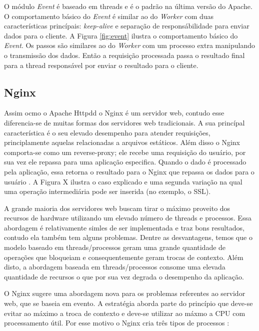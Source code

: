 O módulo \textit{Event} é baseado em threads e é o padrão na última versão do Apache. O comportamento básico do \textit{Event} é similar ao do \textit{Worker} com duas características princípais: \textit{keep-alive} e separação de responsábilidade para enviar dados para o cliente. A Figura \ref{fig:event} ilustra o comportamento básico do \textit{Event}. Os passos são similares ao do \textit{Worker} com um processo extra manipulando o transmissão dos dados. Então a requisição processada passa o resultado final para a thread responsável por enviar o resultado para o cliente.

\subsection{Nginx}

Assim ocmo o Apache Httpdd o Nginx é um servidor web, contudo esse diferencia-se de muitas formas dos servidores web tradicionais. A sua princípal característica é o seu elevado desempenho para atender requisições, principlamente aquelas relacionadas a arquivos estáticos. Além disso o Nginx comporta-se como um reverse-proxy; ele recebe uma requisição do usuário, por sua vez ele repassa para uma aplicação especifica. Quando o dado é processado pela aplicação, essa retorna o resultado para o Nginx que repassa os dados para o usuário \citep{soni}. A Figura X ilustra o caso explicado e uma segunda variação na qual uma operação intermediária pode ser inserida (no exemplo, o SSL).


A grande maioria dos servidores web buscam tirar o máximo proveito dos recursos de hardware utilizando um elevado número de threads e processos. Essa abordagem é relativamente simles de ser implementada e traz bons resultados, contudo ela também tem alguns problemas. Dentre as desvantagens, temos que o modelo baseado em threads/processos geram uma grande quantidade de operações que bloqueiam e consequentemente geram trocas de contexto. Além disto, a abordagem baseada em threads/processos consome uma elevada quantidade de recursos o que por sua vez degrada o desempenho da aplicação.

O Nginx sugere uma abordagem nova para os problemas referentes ao servidor web, que se baseia em evento. A estratégia aborda parte do princípio que deve-se evitar ao máximo a troca de contexto e deve-se utilizar ao máxmo a CPU com processamento útil. Por esse motivo o Nginx cria três tipos de processos \citep{nginx_architecture}:

